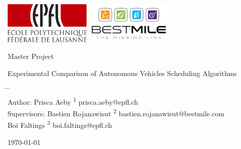 \documentclass[12pt,a4paper]{article}
\begin{document}
\thispagestyle{empty}

  \vspace{-3cm}
  \includegraphics[height=2cm]{./images/EPFL.pdf}
  \hfill \includegraphics[height=2cm]{./images/bestmile.jpg}
  
  \hrulefill
  \vspace{3.0cm}

\begin{center}
 Master Project 
 \LARGE
 \bigskip
 
Experimental Comparison of Autonomous Vehicles Scheduling Algorithms
\end{center}



\vspace{2.0cm}
\begin{tabbing}
\hspace*{3cm}		\=	\hspace*{5cm}							\=	\hspace*{3cm} \\
Author:			\>	Prisca Aeby		  \textsuperscript{1}	\> prisca.aeby@epfl.ch\\
Supervisors:		\>	Bastien Rojanawisut	  \textsuperscript{2}	\> bastien.rojanawisut@bestmile.com\\	
					\>	Boi Faltings    \textsuperscript{3}	\> boi.faltings@epfl.ch\\
\end{tabbing}



\begin{center}

\today
\end{center}

\vfill
\hrulefill
\end{document}
